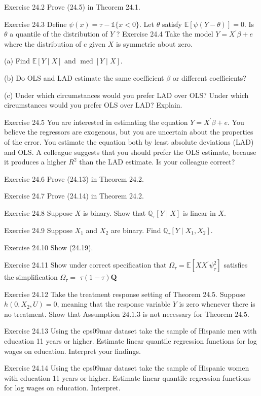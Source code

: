 \documentclass[10pt]{article}
\begin{document}
Exercise 24.2 Prove (24.5) in Theorem 24.1.

Exercise 24.3 Define $\psi(x)=\tau-\mathbb{1}\{x<0\}$. Let $\theta$ satisfy $\mathbb{E}[\psi(Y-\theta)]=0$. Is $\theta$ a quantile of the distribution of $Y$ ? Exercise 24.4 Take the model $Y=X^{\prime} \beta+e$ where the distribution of $e$ given $X$ is symmetric about zero.

(a) Find $\mathbb{E}[Y \mid X]$ and $\operatorname{med}[Y \mid X]$.

(b) Do OLS and LAD estimate the same coefficient $\beta$ or different coefficients?

(c) Under which circumstances would you prefer LAD over OLS? Under which circumstances would you prefer OLS over LAD? Explain.

Exercise 24.5 You are interested in estimating the equation $Y=X^{\prime} \beta+e$. You believe the regressors are exogenous, but you are uncertain about the properties of the error. You estimate the equation both by least absolute deviations (LAD) and OLS. A colleague suggests that you should prefer the OLS estimate, because it produces a higher $R^{2}$ than the LAD estimate. Is your colleague correct?

Exercise 24.6 Prove (24.13) in Theorem 24.2.

Exercise 24.7 Prove (24.14) in Theorem 24.2.

Exercise $24.8$ Suppose $X$ is binary. Show that $\mathbb{Q}_{\tau}[Y \mid X]$ is linear in $X$.

Exercise 24.9 Suppose $X_{1}$ and $X_{2}$ are binary. Find $\mathbb{Q}_{\tau}\left[Y \mid X_{1}, X_{2}\right]$.

Exercise 24.10 Show (24.19).

Exercise 24.11 Show under correct specification that $\Omega_{\tau}=\mathbb{E}\left[X X^{\prime} \psi_{\tau}^{2}\right]$ satisfies the simplification $\Omega_{\tau}=$ $\tau(1-\tau) \boldsymbol{Q}$

Exercise 24.12 Take the treatment response setting of Theorem 24.5. Suppose $h\left(0, X_{2}, U\right)=0$, meaning that the response variable $Y$ is zero whenever there is no treatment. Show that Assumption $24.1 .3$ is not necessary for Theorem $24.5$.

Exercise 24.13 Using the cps09mar dataset take the sample of Hispanic men with education 11 years or higher. Estimate linear quantile regression functions for log wages on education. Interpret your findings.

Exercise 24.14 Using the cps09mar dataset take the sample of Hispanic women with education 11 years or higher. Estimate linear quantile regression functions for log wages on education. Interpret.
\end{document}
